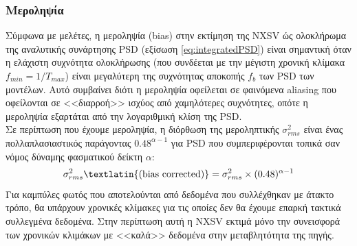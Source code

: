 

\subsubsection*{Μεροληψία}
Σύμφωνα με μελέτες\cite{2013ApJ...771....9A}, η μεροληψία (\textlatin{bias}) στην εκτίμηση της \textlatin{NXSV} ώς ολοκλήρωμα της αναλυτικής συνάρτησης \textlatin{PSD} (εξίσωση \ref{eq:integratedPSD}) είναι σημαντική όταν η ελάχιστη συχνότητα ολοκλήρωσης (που συνδέεται με την μέγιστη χρονική κλίμακα $f_{min} =1/Τ_{max}$) είναι μεγαλύτερη της συχνότητας αποκοπής $f_b$ των \textlatin{PSD} των μοντέλων. Αυτό συμβαίνει διότι η μεροληψία οφείλεται σε φαινόμενα \textlatin{aliasing} που οφείλονται σε <<διαρροή>> ισχύος από χαμηλότερες συχνότητες, οπότε η μεροληψία εξαρτάται από την λογαριθμική κλίση της \textlatin{PSD}.\\
Σε περίπτωση που έχουμε μεροληψία, η διόρθωση της μεροληπτικής $\sigma_{rms}^2$ είναι ένας πολλαπλασιαστικός παράγοντας $ 0.48^{\alpha-1}$ για \textlatin{PSD} που συμπεριφέρονται τοπικά σαν νόμος δύναμης φασματικού δείκτη $\alpha $\cite{2013ApJ...771....9A}:
\begin{equation}
    \sigma_{rms}^2\mbox{\textlatin{(bias corrected)}} = \sigma_{rms}^2 \times (0.48)^{\alpha-1}
\end{equation}
Για καμπύλες φωτός που αποτελούνται από δεδομένα που συλλέχθηκαν με άτακτο τρόπο, θα υπάρχουν χρονικές κλίμακες για τις οποίες δεν θα έχουμε επαρκή τακτικά συλλεγμένα δεδομένα. Στην περίπτωση αυτή η \textlatin{NXSV} εκτιμά μόνο την συνεισφορά των χρονικών κλιμάκων με <<καλά>> δεδομένα στην μεταβλητότητα της πηγής\cite{2013ApJ...771....9A}. 


